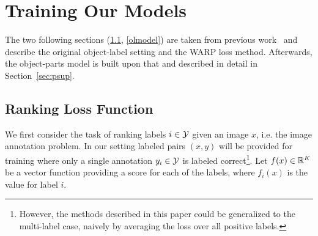








\section{Training Our Models} \label{sec:training}

The two following sections (\ref{warp}, \ref{olmodel}) are taken from
previous work~\citep{image-wsabie} and describe the original object-label
setting and the WARP loss method. Afterwards, the object-parts model is built
upon that and described in detail in Section~\ref{sec:psup}. 

\subsection{Ranking Loss Function} \label{warp}
\newcommand{\ybar}{{\bar{y}}}
\newcommand{\Ybar}{n}
\newcommand{\newL}{\tilde{L}}
\newcommand{\newPhi}{\tilde{\Phi}}
\newcommand{\proba}{\text{Pr}}
We first consider the task of ranking labels $i \in {\cal Y}$ given  an image $x$,
i.e. the image annotation problem.
In our setting labeled pairs $(x,y)$ will be provided for training where
only a single annotation $y_i \in {\cal Y}$ is labeled correct\footnote{However, the methods described in this paper could be generalized to the multi-label case, naively by averaging the loss over all positive labels.}.
Let $f(x) \in \mathbb{R}^K$ be a vector function  providing a
score for each of the labels, where $f_i(x)$ is
the value for label $i$.


